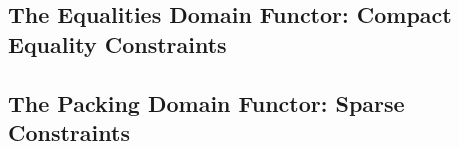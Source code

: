 
\subsection{The Equalities Domain Functor: Compact Equality Constraints}
\label{s:4:4:eqs}

\subsection{The Packing Domain Functor: Sparse Constraints}
\label{s:4:5:packs}
